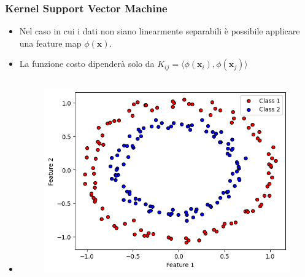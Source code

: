 \documentclass{beamer}
\begin{document}
\begin{frame}

  \frametitle{Kernel Support Vector Machine}
  
  \begin{itemize}
    \item<1-> Nel caso in cui i dati non siano linearmente separabili è possibile applicare una feature map $\phi(\mathbf{x})$.
    \item<3-> La funzione costo dipenderà solo da $K_{ij}=\langle \phi(\mathbf{x}_i), \phi(\mathbf{x}_j) \rangle$
    
    \item<2->[]
      \begin{columns}
        \begin{figure}
          \includegraphics[width=1\textwidth]{images/circles.png}
        \end{figure}
      

\end{columns}
\end{itemize}
\end{frame}
\end{document}
